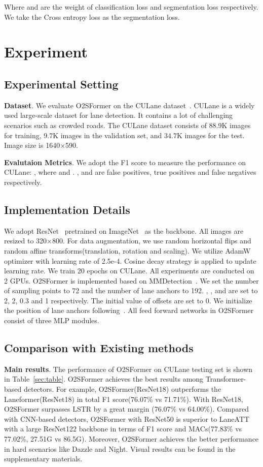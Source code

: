 \documentclass{bmvc2k}
\begin{document}
 Where  and  are the weight of classification loss and segmentation loss respectively. 
 We take the Cross entropy loss as the segmentation loss.
 \vspace{-0.35cm}
 \section{Experiment}
 \subsection{Experimental Setting}
 {\bf Dataset}. We evaluate O2SFormer on the CULane dataset~\cite{pan2018spatial}. CULane is a widely used large-scale dataset for lane detection. 
 It contains a lot of challenging scenarios such as crowded roads. The CULane dataset 
 consists of 88.9K images for training, 9.7K images in the validation set, and 34.7K images for the test. Image size is 1640×590. 
 
 {\bf Evalutaion Metrics}. We adopt the F1 score to measure the performance on CULane: , where  and . 
 ,  and  are false positives, true positives and false negatives respectively.
 \vspace{-0.3cm}
 \subsection{Implementation Details}
 We adopt ResNet~\cite{he2016deep} pretrained on ImageNet~\cite{deng2009imagenet} as the backbone. 
 All images are resized to 320×800. For data augmentation, we use random horizontal 
 flips and random affine transforms(translation, rotation and scaling). We utilize 
 AdamW~\cite{loshchilov2017decoupled} optimizer with learning rate of 2.5e-4. Cosine decay strategy is applied to 
 update learning rate. We train 20 epochs on CULane. All experiments are conducted on 
 2 GPUs. O2SFormer is implemented based on MMDetection~\cite{mmdetection}. We 
 set the number of sampling points  to 72 and the number of lane anchors to 192. 
 , ,  and  are set to 2, 2, 0.3 and 1 respectively.
 The initial value of  offsets are set to 0. We initialize the position of lane anchors following~\cite{zheng2022clrnet}.
 All feed forward networks in O2SFormer consist of three MLP modules.
 \vspace{-0.2cm}
 \subsection{Comparison with Existing methods}
 {\bf Main results}. The performance of O2SFormer on CULane testing set is shown in Table~\ref{sec:table}. O2SFormer 
  achieves the best results among Transformer-based detectors. For example, O2SFormer(ResNet18) 
  outperforms the Laneformer(ResNet18) in total F1 score(76.07\% vs 71.71\%). With ResNet18, O2SFormer surpasses LSTR by a great margin (76.07\% vs 64.00\%). Compared with CNN-based detectors, O2SFormer with ResNet50 is 
  superior to LaneATT with a large ResNet122 backbone in terms of F1 score and MACs(77.83\% vs 77.02\%, 27.51G vs 86.5G). 
  Moreover, O2SFormer achieves the better performance in hard scenarios like Dazzle and Night. Visual results can be found in the supplementary materials.
 
\end{document}
